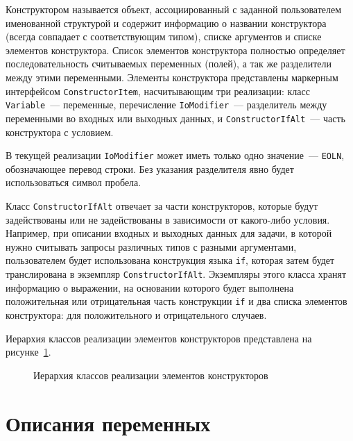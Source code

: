 \documentclass[times,specification,annotation]{style/itmo-student-thesis/itmo-student-thesis}
\begin{document}
Конструктором называется объект, ассоциированный с заданной пользователем именованной структурой и содержит информацию о названии конструктора (всегда совпадает с соответствующим типом), списке аргументов и списке элементов конструктора. Список элементов конструктора полностью определяет последовательность считываемых переменных (полей), а так же разделители между этими переменными. Элементы конструктора представлены маркерным интерфейсом \texttt{ConstructorItem}, насчитывающим три реализации: класс \texttt{Variable}~--- переменные, перечисление \texttt{IoModifier}~--- разделитель между переменными во входных или выходных данных, и \texttt{ConstructorIfAlt}~--- часть конструктора с условием.

В текущей реализации \texttt{IoModifier} может иметь только одно значение~--- \texttt{EOLN}, обозначающее перевод строки. Без указания разделителя явно будет использоваться символ пробела.

Класс \texttt{ConstructorIfAlt} отвечает за части конструкторов, которые будут задействованы или не задействованы в зависимости от какого-либо условия. Например, при описании входных и выходных данных для задачи, в которой нужно считывать запросы различных типов с разными аргументами, пользователем будет использована конструкция языка \texttt{if}, которая затем будет транслирована в экземпляр \texttt{ConstructorIfAlt}. Экземпляры этого класса хранят информацию о выражении, на основании которого будет выполнена положительная или отрицательная часть конструкции \texttt{if} и два списка элементов конструктора: для положительного и отрицательного случаев.

Иерархия классов реализации элементов конструкторов представлена на рисунке~\ref{constructor-items-classes-hierarchy}.

\begin{figure}[!h]
\caption{Иерархия классов реализации элементов конструкторов}\label{constructor-items-classes-hierarchy}
\centering
{}
\end{figure}

\section{Описания переменных}
\end{document}
